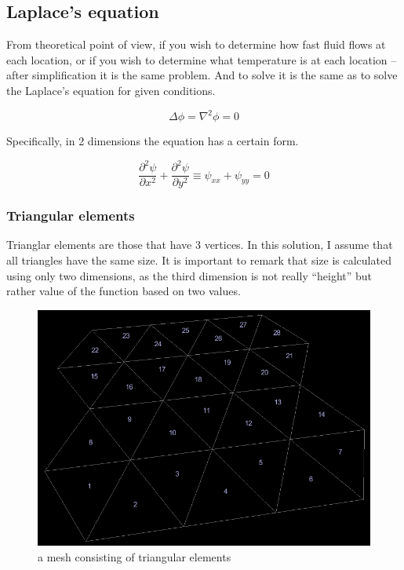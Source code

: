 \documentclass[a4paper,12pt]{article}
\begin{document}

\subsection{Laplace's equation}

From theoretical point of view, if you wish to determine how fast fluid flows at each location, or if you wish to
determine what temperature is at each location -- after simplification it is the same problem. And to solve it is the
same as to solve the Laplace's equation for given conditions. \cite{wiki_laplaces_equation}

\[ \Delta \phi =  \nabla^2 \phi = 0 \]

Specifically, in 2 dimensions the equation has a certain form.

\[ \frac{\partial^2 \psi}{\partial x^2} + \frac{\partial^2 \psi}{\partial y^2} \equiv \psi_{xx} + \psi_{yy} = 0 \]


\subsubsection{Triangular elements}

Trianglar elements are those that have 3 vertices. In this solution, I assume that all triangles have the same size. It
is important to remark that size is calculated using only two dimensions, as the third dimension is not really
``height'' but rather value of the function based on two values.

\begin{figure}[H]
\begin{center}
  \includegraphics[width=\textwidth]{mesh_triangular}
\end{center}
\caption{a mesh consisting of triangular elements}
\end{figure}
\end{document}
